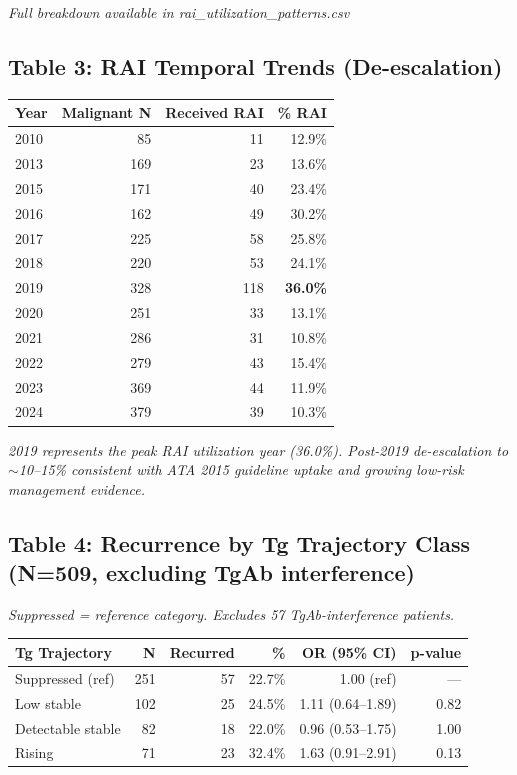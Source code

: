 \documentclass{article}
\begin{document}
\vspace{0.3cm}
\noindent\textit{Full breakdown available in rai\_utilization\_patterns.csv}

\subsection*{Table 3: RAI Temporal Trends (De-escalation)}
\begin{tabular}{lrrr}
\toprule
Year & Malignant N & Received RAI & \% RAI \\
\midrule
2010 &  85 & 11 & 12.9\% \\
2013 & 169 & 23 & 13.6\% \\
2015 & 171 & 40 & 23.4\% \\
2016 & 162 & 49 & 30.2\% \\
2017 & 225 & 58 & 25.8\% \\
2018 & 220 & 53 & 24.1\% \\
2019 & 328 & 118 & \textbf{36.0\%} \\
2020 & 251 & 33 & 13.1\% \\
2021 & 286 & 31 & 10.8\% \\
2022 & 279 & 43 & 15.4\% \\
2023 & 369 & 44 & 11.9\% \\
2024 & 379 & 39 & 10.3\% \\
\bottomrule
\end{tabular}

\vspace{0.3cm}
\noindent\textit{2019 represents the peak RAI utilization year (36.0\%). Post-2019 de-escalation
to $\sim$10--15\% consistent with ATA 2015 guideline uptake and growing low-risk management evidence.}

\subsection*{Table 4: Recurrence by Tg Trajectory Class (N=509, excluding TgAb interference)}
\textit{Suppressed = reference category. Excludes 57 TgAb-interference patients.}

\begin{tabular}{lrrrrr}
\toprule
Tg Trajectory & N & Recurred & \% & OR (95\% CI) & p-value \\
\midrule
Suppressed (ref)   & 251 & 57 & 22.7\% & 1.00 (ref) & --- \\
Low stable         & 102 & 25 & 24.5\% & 1.11 (0.64--1.89) & 0.82 \\
Detectable stable  &  82 & 18 & 22.0\% & 0.96 (0.53--1.75) & 1.00 \\
Rising             &  71 & 23 & 32.4\% & 1.63 (0.91--2.91) & 0.13 \\
\bottomrule
\end{tabular}
\end{document}
